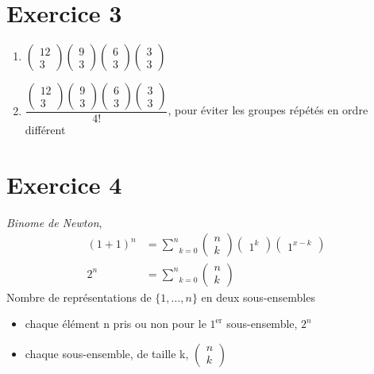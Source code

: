 \documentclass[fontsize=10pt]{article}
\begin{document}
\section*{Exercice 3}
\begin{enumerate}
\item
$\begin{pmatrix} 
12\\
3
\end{pmatrix}
\begin{pmatrix} 
9\\
3
\end{pmatrix}
\begin{pmatrix} 
6\\
3
\end{pmatrix}
\begin{pmatrix} 
3\\
3
\end{pmatrix}$
\item $\dfrac{
\begin{pmatrix} 
12\\
3
\end{pmatrix}
\begin{pmatrix} 
9\\
3
\end{pmatrix}
\begin{pmatrix} 
6\\
3
\end{pmatrix}
\begin{pmatrix} 
3\\
3
\end{pmatrix}}{4!}$, pour éviter les groupes répétés en ordre différent


\end{enumerate}
\section*{Exercice 4}
\emph{Binome de Newton},  
\begin{align*}
(1+1)^n &=\underset{k=0}{\overset{n}{\sum}} 
\begin{pmatrix} 
n\\
k
\end{pmatrix}
\begin{pmatrix} 
1^k
\end{pmatrix}
\begin{pmatrix} 
1^{x-k}
\end{pmatrix}\\
2^n&=\underset{k=0}{\overset{n}{\sum}}
\begin{pmatrix} 
n\\
k
\end{pmatrix}
\end{align*}
Nombre de représentations de $\{ 1,\dots,n\}$ en deux sous-ensembles
\begin{itemize}
\item chaque élément n pris ou non pour le $1^{\text{er}}$ sous-ensemble, $2^n$
\item chaque sous-ensemble, de taille k, $
\begin{pmatrix} 
n\\
k
\end{pmatrix}$
\end{itemize}
\end{document}
